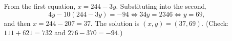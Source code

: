 From the first equation, $x=244-3y$. Substituting into the second,
\[4y-10(244-3y)=-94\iff34y=2346\iff y=69,\]
and then $x=244-207=37$. The solution is $\boxed{(x,y)=(37,69)}$. (Check: $111+621=732$ and $276-370=-94$.)
